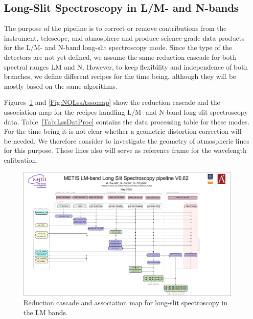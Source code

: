\subsection{Long-Slit Spectroscopy in L/M- and N-bands}

The purpose of the pipeline is to correct or remove contributions from
the instrument, telescope, and atmosphere and produce science-grade
data products for the L/M- and N-band long-slit spectroscopy
mode. Since the type of the detectors are not yet defined, we assume
the same reduction cascade for both spectral ranges LM and
N. However, to keep flexibility and independence of both branches, we
define different recipes for the time being, although they will be
mostly based on the same algorithms.

Figures~\ref{Fig:LMLssAssomap} and \ref{Fig:NQLssAssomap} show the reduction cascade and the
association map for the recipes handling L/M- and N-band long-slit
spectroscopy data.  Table~\ref{Tab:LssDatProc} contains the data processing table for these
modes. For the time being it is not clear whether a geometric
distortion correction will be needed. We therefore consider to investigate
the geometry of atmospheric lines for this purpose. These lines also will
serve as reference frame for the wavelength calibration.

\begin{figure}
  \centering
  \includegraphics[width=0.9\textheight]{figures/LM_LSS_pipeline_wf_draft_latest_v0.62.pdf}
  \caption[Reduction cascade and association map for LM long-slit
  spectroscopy]{Reduction cascade and association map for long-slit
    spectroscopy in the LM bands.  }
  \label{Fig:LMLssAssomap}
\end{figure}



